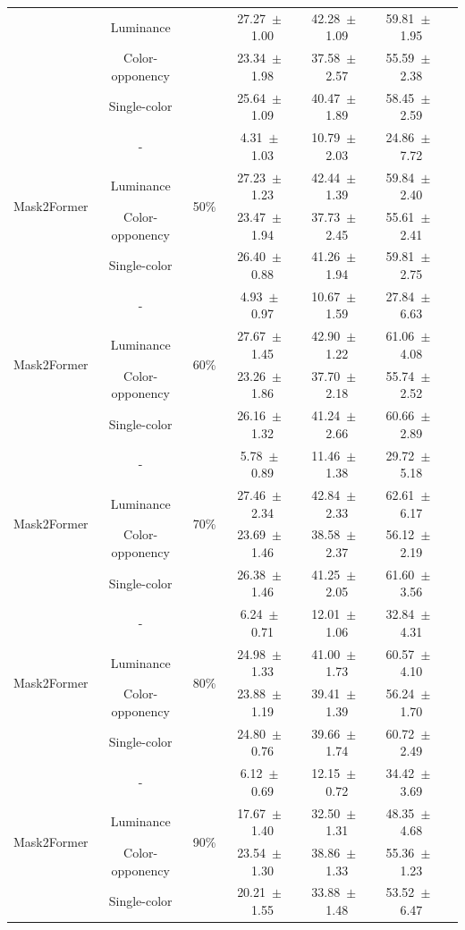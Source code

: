 \begin{table}[h]
\begin{tabular}{@{}lccc ccc@{}}
& Luminance & & 27.27~$\pm$~1.00 & 42.28~$\pm$~1.09 & 59.81~$\pm$~1.95 \\
& Color-opponency & & 23.34~$\pm$~1.98 & 37.58~$\pm$~2.57 & 55.59~$\pm$~2.38 \\
& Single-color & & 25.64~$\pm$~1.09 & 40.47~$\pm$~1.89 & 58.45~$\pm$~2.59 \\
\midrule
\multirow{4}{*}{Mask2Former} & - & \multirow{4}{*}{50\%} & 4.31~$\pm$~1.03 & 10.79~$\pm$~2.03 & 24.86~$\pm$~7.72 \\
& Luminance & & 27.23~$\pm$~1.23 & 42.44~$\pm$~1.39 & 59.84~$\pm$~2.40 \\
& Color-opponency & & 23.47~$\pm$~1.94 & 37.73~$\pm$~2.45 & 55.61~$\pm$~2.41 \\
& Single-color & & 26.40~$\pm$~0.88 & 41.26~$\pm$~1.94 & 59.81~$\pm$~2.75 \\
\midrule
\multirow{4}{*}{Mask2Former} & - & \multirow{4}{*}{60\%} & 4.93~$\pm$~0.97 & 10.67~$\pm$~1.59 & 27.84~$\pm$~6.63 \\
& Luminance & & 27.67~$\pm$~1.45 & 42.90~$\pm$~1.22 & 61.06~$\pm$~4.08 \\
& Color-opponency & & 23.26~$\pm$~1.86 & 37.70~$\pm$~2.18 & 55.74~$\pm$~2.52 \\
& Single-color & & 26.16~$\pm$~1.32 & 41.24~$\pm$~2.66 & 60.66~$\pm$~2.89 \\
\midrule
\multirow{4}{*}{Mask2Former} & - & \multirow{4}{*}{70\%} & 5.78~$\pm$~0.89 & 11.46~$\pm$~1.38 & 29.72~$\pm$~5.18 \\
& Luminance & & 27.46~$\pm$~2.34 & 42.84~$\pm$~2.33 & 62.61~$\pm$~6.17 \\
& Color-opponency & & 23.69~$\pm$~1.46 & 38.58~$\pm$~2.37 & 56.12~$\pm$~2.19 \\
& Single-color & & 26.38~$\pm$~1.46 & 41.25~$\pm$~2.05 & 61.60~$\pm$~3.56 \\
\midrule
\multirow{4}{*}{Mask2Former} & - & \multirow{4}{*}{80\%} & 6.24~$\pm$~0.71 & 12.01~$\pm$~1.06 & 32.84~$\pm$~4.31 \\
& Luminance & & 24.98~$\pm$~1.33 & 41.00~$\pm$~1.73 & 60.57~$\pm$~4.10 \\
& Color-opponency & & 23.88~$\pm$~1.19 & 39.41~$\pm$~1.39 & 56.24~$\pm$~1.70 \\
& Single-color & & 24.80~$\pm$~0.76 & 39.66~$\pm$~1.74 & 60.72~$\pm$~2.49 \\
\midrule
\multirow{4}{*}{Mask2Former} & - & \multirow{4}{*}{90\%} & 6.12~$\pm$~0.69 & 12.15~$\pm$~0.72 & 34.42~$\pm$~3.69 \\
& Luminance & & 17.67~$\pm$~1.40 & 32.50~$\pm$~1.31 & 48.35~$\pm$~4.68 \\
& Color-opponency & & 23.54~$\pm$~1.30 & 38.86~$\pm$~1.33 & 55.36~$\pm$~1.23 \\
& Single-color & & 20.21~$\pm$~1.55 & 33.88~$\pm$~1.48 & 53.52~$\pm$~6.47 \\
\midrule
\bottomrule
\end{tabular}
\label{tab:sparse_results_mask2former_dark_zurich}
\end{table}